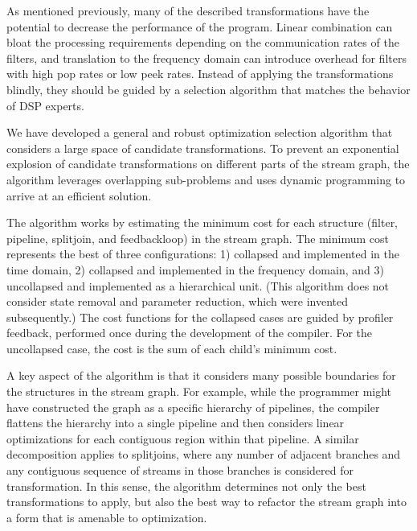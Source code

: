 As mentioned previously, many of the described transformations have
the potential to decrease the performance of the program.  Linear
combination can bloat the processing requirements depending on the
communication rates of the filters, and translation to the frequency
domain can introduce overhead for filters with high pop rates or low
peek rates.  Instead of applying the transformations blindly, they
should be guided by a selection algorithm that matches the behavior of
DSP experts.

We have developed a general and robust optimization selection
algorithm that considers a large space of candidate transformations.
To prevent an exponential explosion of candidate transformations on
different parts of the stream graph, the algorithm leverages
overlapping sub-problems and uses dynamic programming to arrive at an
efficient solution.

The algorithm works by estimating the minimum cost for each structure
(filter, pipeline, splitjoin, and feedbackloop) in the stream
graph. The minimum cost represents the best of three configurations:
1) collapsed and implemented in the time domain, 2) collapsed and
implemented in the frequency domain, and 3) uncollapsed and
implemented as a hierarchical unit.  (This algorithm does not consider
state removal and parameter reduction, which were invented
subsequently.)  The cost functions for the collapsed cases are guided
by profiler feedback, performed once during the development of the
compiler.  For the uncollapsed case, the cost is the sum of each
child's minimum cost.

A key aspect of the algorithm is that it considers many possible
boundaries for the structures in the stream graph.  For example, while
the programmer might have constructed the graph as a specific
hierarchy of pipelines, the compiler flattens the hierarchy into a
single pipeline and then considers linear optimizations for each
contiguous region within that pipeline.  A similar decomposition
applies to splitjoins, where any number of adjacent branches and any
contiguous sequence of streams in those branches is considered for
transformation.  In this sense, the algorithm determines not only the
best transformations to apply, but also the best way to refactor the
stream graph into a form that is amenable to optimization.



